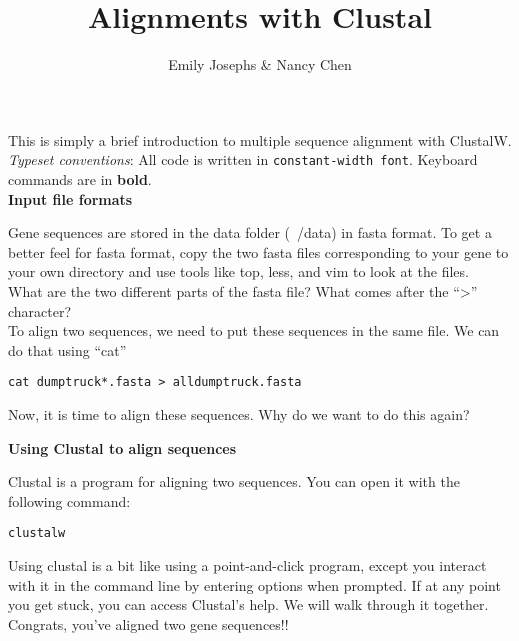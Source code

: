\documentclass[11pt]{article}
\title{Alignments with Clustal}
\author{Emily Josephs \& Nancy Chen}
\begin{document}
\maketitle

This is simply a brief introduction to multiple sequence alignment with ClustalW.\\
\textsl{Typeset conventions}: All code is written in \texttt{constant-width font}. Keyboard commands are in \textbf{bold}.\\

\textbf{Input file formats}

Gene sequences are stored in the data folder (~/data) in fasta format. To get a better feel for fasta format, copy the two fasta files corresponding to your gene to your own directory and use tools like top, less, and vim to look at the files. \\

What are the two different parts of the fasta file? What comes after the ``\textgreater'' character? \\

To align two sequences, we need to put these sequences in the same file. We can do that using ``cat''\\
\begin{itemize*}
\item \texttt {cat dumptruck*.fasta > alldumptruck.fasta}\\
\end{itemize*}

Now, it is time to align these sequences. Why do we want to do this again?

\textbf{Using Clustal to align sequences}

Clustal is a program for aligning two sequences. You can open it with the following command:\\

\begin{itemize*}
\item \texttt {clustalw}\\
\end{itemize*}

Using clustal is a bit like using a point-and-click program, except you interact with it in the command line by entering options when prompted. If at any point you get stuck, you can access Clustal's help. We will walk through it together.\\

Congrats, you've aligned two gene sequences!!
\end{document}
